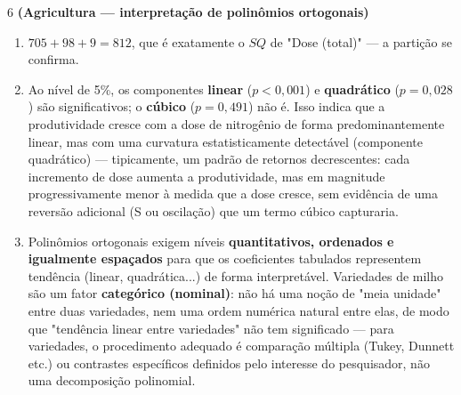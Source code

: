 \documentclass[11pt]{article}
\begin{document}
\begin{questao}{6} \textbf{(Agricultura --- interpretação de polinômios ortogonais)}
\end{questao}
\begin{solucao}
\begin{enumerate}[label=(\alph*)]
  \item $705 + 98 + 9 = 812$, que é exatamente o $SQ$ de "Dose (total)" --- a partição se
    confirma.
  \item Ao nível de 5\%, os componentes \textbf{linear} ($p<0{,}001$) e \textbf{quadrático}
    ($p=0{,}028$) são significativos; o \textbf{cúbico} ($p=0{,}491$) não é. Isso indica que a
    produtividade cresce com a dose de nitrogênio de forma predominantemente linear, mas com uma
    curvatura estatisticamente detectável (componente quadrático) --- tipicamente, um padrão de
    retornos decrescentes: cada incremento de dose aumenta a produtividade, mas em magnitude
    progressivamente menor à medida que a dose cresce, sem evidência de uma reversão adicional
    (S ou oscilação) que um termo cúbico capturaria.
  \item Polinômios ortogonais exigem níveis \textbf{quantitativos, ordenados e igualmente
    espaçados} para que os coeficientes tabulados representem tendência (linear, quadrática...)
    de forma interpretável. Variedades de milho são um fator \textbf{categórico (nominal)}: não
    há uma noção de "meia unidade" entre duas variedades, nem uma ordem numérica natural entre
    elas, de modo que "tendência linear entre variedades" não tem significado --- para
    variedades, o procedimento adequado é comparação múltipla (Tukey, Dunnett etc.) ou contrastes
    específicos definidos pelo interesse do pesquisador, não uma decomposição polinomial.
\end{enumerate}
\end{solucao}
\end{document}
